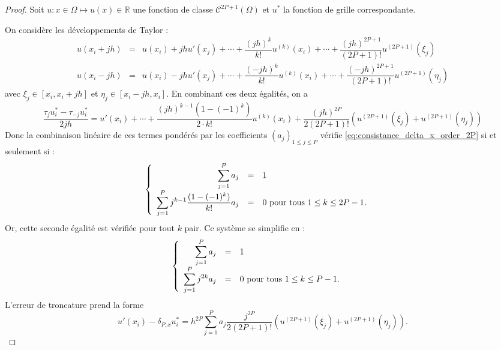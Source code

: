 \begin{proof}
Soit $u : x \in \Omega \mapsto u(x) \in \mathbb{R}$ une fonction de classe $\mathcal{C}^{2P+1}( \Omega)$ et $u^*$ la fonction de grille correspondante.

On considère les développements de Taylor :
\begin{equation}
\begin{array}{rcl}
u(x_i + jh) & = & u(x_i) + j h u'(x_j) + \cdots + \dfrac{(jh)^k}{k!}u^{(k)}(x_i) + \cdots +\dfrac{(jh)^{2P+1}}{(2P+1)!} u^{(2P+1)}(\xi_j)\\
u(x_i - jh) & = & u(x_i) - j h u'(x_j) + \cdots + \dfrac{(-jh)^k}{k!}u^{(k)}(x_i) + \cdots +\dfrac{(-jh)^{2P+1}}{(2P+1)!} u^{(2P+1)}(\eta_j)
\end{array}
\end{equation}
avec $\xi_j \in [x_i, x_i+jh]$ et $\eta_j \in [x_i-jh, x_i]$. En combinant ces deux égalités, on a
\begin{equation}
\dfrac{\tau_ju^*_i - \tau_{-j} u^*_i}{2jh} = u'(x_i) + \cdots + \dfrac{(jh)^{k-1}(1 - (-1)^k)}{2 \cdot k!} u^{(k)}(x_i) + \dfrac{(jh)^{2P}}{2(2P+1)!} \left( u^{(2P+1)}(\xi_j) + u^{(2P+1)}(\eta_j) \right)
\end{equation}
Donc la combinaison linéaire de ces termes pondérés par les coefficients $(a_j)_{1 \leq j \leq P}$ vérifie \eqref{eq:consistance_delta_x_order_2P} si et seulement si :
\begin{equation}
\left\lbrace
\begin{array}{rcll}
\displaystyle\sum\limits_{j=1}^P a_j & = & 1 & \\
\displaystyle\sum\limits_{j=1}^P j^{k-1} \dfrac{(1 - (-1)^k)}{k!} a_j & = & 0 \text{ pour tous } 1 \leq k \leq 2P-1.
\end{array}
\right.
\end{equation}
Or, cette seconde égalité est vérifiée pour tout $k$ pair. Ce système se simplifie en :
\begin{equation}
\left\lbrace
\begin{array}{rcll}
\displaystyle\sum\limits_{j=1}^P a_j & = & 1 & \\
\displaystyle\sum\limits_{j=1}^P j^{2k} a_j & = & 0 \text{ pour tous } 1 \leq k \leq P-1.
\end{array}
\right.
\end{equation}
L'erreur de troncature prend la forme
\begin{equation}
u'(x_i) - \delta_{P,x} u^*_i = h^{2P} \sum_{j=1}^P a_j \dfrac{j^{2P}}{2(2P+1)!} \left( u^{(2P+1)}(\xi_j) + u^{(2P+1)}(\eta_j) \right).
\end{equation}
\end{proof}

